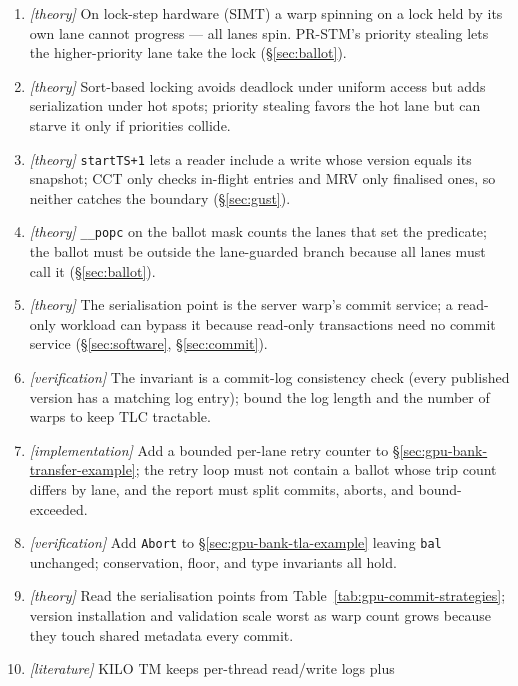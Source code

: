 \begin{enumerate}
    \item \emph{[theory]} On lock-step hardware (SIMT) a warp spinning on a lock held by its
          own lane cannot progress --- all lanes spin.  PR-STM's priority
          stealing lets the higher-priority lane take the lock
          (\S\ref{sec:ballot}).
    \item \emph{[theory]} Sort-based locking avoids deadlock under uniform access but adds
          serialization under hot spots; priority stealing favors the hot
          lane but can starve it only if priorities collide.
    \item \emph{[theory]} \texttt{startTS+1} lets a reader include a write whose version
          equals its snapshot; CCT only checks in-flight entries and MRV
          only finalised ones, so neither catches the boundary
          (\S\ref{sec:gust}).
    \item \emph{[theory]} \texttt{\_\_popc} on the ballot mask counts the lanes that set the
          predicate; the ballot must be outside the lane-guarded branch
          because all lanes must call it (\S\ref{sec:ballot}).
    \item \emph{[theory]} The serialisation point is the server warp's commit service; a
          read-only workload can bypass it because read-only transactions
          need no commit service (\S\ref{sec:software},
          \S\ref{sec:commit}).
    \item \emph{[verification]} The invariant is a commit-log consistency check (every published
          version has a matching log entry); bound the log length and the
          number of warps to keep TLC tractable.
    \item \emph{[implementation]} Add a bounded per-lane retry counter to
          \S\ref{sec:gpu-bank-transfer-example}; the retry loop must not
          contain a ballot whose trip count differs by lane, and the report
          must split commits, aborts, and bound-exceeded.
    \item \emph{[verification]} Add \texttt{Abort} to
          \S\ref{sec:gpu-bank-tla-example} leaving \texttt{bal} unchanged;
          conservation, floor, and type invariants all hold.
    \item \emph{[theory]} Read the serialisation points from
          Table~\ref{tab:gpu-commit-strategies}; version installation and
          validation scale worst as warp count grows because they touch
          shared metadata every commit.
    \item \emph{[literature]} KILO TM keeps per-thread read/write logs plus

\end{enumerate}
